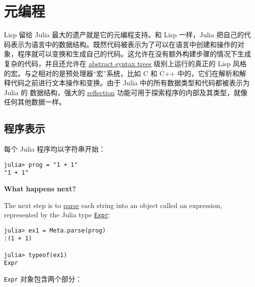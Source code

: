 \hypertarget{899642791320764560}{}


\chapter{元编程}



Lisp 留给 Julia 最大的遗产就是它的元编程支持。和 Lisp 一样，Julia 把自己的代码表示为语言中的数据结构。既然代码被表示为了可以在语言中创建和操作的对象，程序就可以变换和生成自己的代码。这允许在没有额外构建步骤的情况下生成复杂的代码，并且还允许在 \href{https://en.wikipedia.org/wiki/Abstract\_syntax\_tree}{abstract syntax trees} 级别上运行的真正的 Lisp 风格的宏。与之相对的是预处理器“宏”系统，比如 C 和 C++ 中的，它们在解析和解释代码之前进行文本操作和变换。由于 Julia 中的所有数据类型和代码都被表示为 Julia 的 数据结构，强大的 \href{https://en.wikipedia.org/wiki/Reflection\_omputer\_\%28cprogramming\%29}{reflection} 功能可用于探索程序的内部及其类型，就像任何其他数据一样。



\hypertarget{13890173916214395200}{}


\section{程序表示}



每个 Julia 程序均以字符串开始：




\begin{verbatim}
julia> prog = "1 + 1"
"1 + 1"
\end{verbatim}



\textbf{What happens next?}



The next step is to \href{https://en.wikipedia.org/wiki/Parsing\#Computer\_languages}{parse} each string into an object called an expression, represented by the Julia type \hyperlink{17120496304147995299}{\texttt{Expr}}:




\begin{verbatim}
julia> ex1 = Meta.parse(prog)
:(1 + 1)

julia> typeof(ex1)
Expr
\end{verbatim}



\texttt{Expr} 对象包含两个部分：



